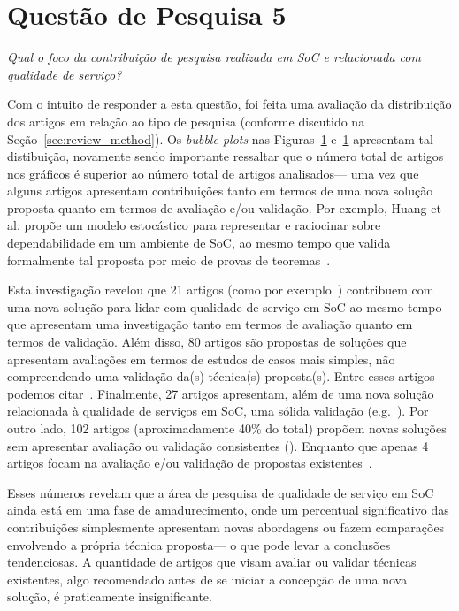 \section{Questão de Pesquisa 5}

\emph{Qual o foco da contribuição de pesquisa realizada em SoC e relacionada com qualidade de serviço? }

Com o intuito de responder a esta questão, foi feita uma avalia\c c\~{a}o da distribui\c c\~{a}o dos 
artigos em rela\c c\~{a}o ao tipo de pesquisa (conforme discutido na Se\c c\~{a}o~\ref{sec:review_method}). 
Os \emph{bubble plots} nas Figuras~\ref{} e~\ref{}  apresentam tal distibui\c c\~{a}o, novamente sendo importante 
ressaltar que o n\'{u}mero total de artigos nos gr\'{a}ficos \'{e} superior ao n\'{u}mero total de artigos analisados--- 
uma vez que alguns artigos apresentam contribui\c c\~{o}es tanto em termos de uma nova solu\c c\~{a}o proposta 
quanto em termos de avalia\c c\~{a}o e/ou valida\c c\~{a}o. Por exemplo, Huang et al. prop\~{o}e um 
modelo estoc\'{a}stico para representar e raciocinar sobre dependabilidade em um ambiente de SoC, ao mesmo tempo 
que valida formalmente tal proposta por meio de provas de teoremas~\cite{huang:scc2011}.

Esta investiga\c c\~{a}o revelou que 21 artigos (como por exemplo~\cite{jeong:fqs2009,ardagna:jss2010}) 
contribuem com uma nova solu\c c\~{a}o para 
lidar com qualidade de servi\c co em SoC ao mesmo tempo que apresentam uma investiga\c c\~{a}o tanto 
em termos de avalia\c c\~{a}o quanto em termos de valida\c c\~{a}o. Al\'{e}m disso, 80 
artigos s\~{a}o propostas de solu\c c\~{o}es que apresentam 
avalia\c c\~{o}es em termos de estudos de casos mais simples, n\~{a}o compreendendo uma 
valida\c c\~{a}o da(s) t\'{e}cnica(s) proposta(s). Entre esses artigos podemos 
citar~\cite{filieri:faa2012, pernici:services2011,nascimento:splc2011}. Finalmente, 27 artigos apresentam, 
al\'{e}m de uma nova solu\c c\~{a}o relacionada \`{a} qualidade de servi\c cos em SoC, 
uma s\'{o}lida valida\c c\~{a}o (e.g.~\cite{huang:scc2011,binshtok:icsoc2009}).    
Por outro lado, 102 artigos (aproximadamente 40\% do total) prop\~{o}em novas 
solu\c c\~{o}es sem apresentar avalia\c c\~{a}o ou valida\c c\~{a}o consistentes (\cite{balfagih:icime2011,fiadeiro:fac2011,khazankin:scc2011}). 
Enquanto que apenas 4 artigos focam na avalia\c c\~{a}o e/ou valida\c c\~{a}o de 
propostas existentes~\cite{voelz:edoc2010,moayed:icsea2010,cavallo:pesos2010,banerjee:isorcw2011}.  

Esses n\'{u}meros revelam que a \'{a}rea de pesquisa de qualidade de servi\c co em 
SoC ainda est\'{a} em uma fase 
de amadurecimento, onde um percentual significativo das contribui\c c\~{o}es 
simplesmente apresentam novas abordagens ou fazem compara\c c\~{o}es envolvendo a 
pr\'{o}pria t\'{e}cnica proposta--- o que pode levar a conclus\~{o}es tendenciosas. A quantidade 
de artigos que visam avaliar ou validar t\'{e}cnicas existentes, algo recomendado antes 
de se iniciar a concep\c c\~{a}o de uma nova solu\c c\~{a}o, \'{e} praticamente insignificante. 
 
